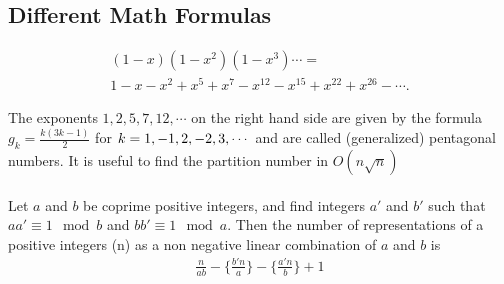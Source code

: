 \begin{multicols*}{\MCOLS}
\subsection{Different Math Formulas}
\begin{multline*}
\displaystyle (1 - x)(1 - x ^ 2)(1 - x^3)\cdots = \\ 1 - x - x^2 + x^5 + x^7 - x^{12} - x^{15} + x^{22} + x^{26} - \cdots.
\end{multline*}

The exponents $\displaystyle 1, 2, 5, 7, 12,\cdots$ on the right hand side are given by the formula $g_k = \frac{k(3k - 1)}{2}$ for $\displaystyle \displaystyle k = 1, -1, 2, -2, 3, \cdots$ and are called (generalized) pentagonal numbers.
It is useful to find the partition number in $O(n \sqrt{n})$ \\ \\
Let $\displaystyle a$ and $b$ be coprime positive integers, and find integers $\displaystyle a{\prime}$ and $b{\prime}$ such that $\displaystyle aa{\prime} \equiv 1 \mod b$ and $bb{\prime} \equiv 1 \mod a$. Then the number of representations of a positive integers (n) as a non negative linear combination of $\displaystyle a$ and $b$ is 
\begin{multline*}
\displaystyle \frac{n}{ab}-\Big\{\frac{b{\prime} n}{a}\Big\}-\Big\{\frac{a{\prime} n}{b}\Big\} + 1
\end{multline*}

\end{multicols*}
